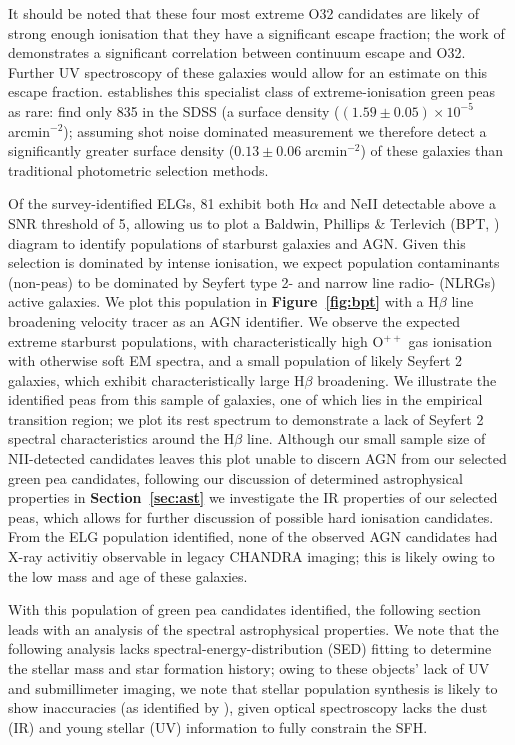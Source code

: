 \documentclass[fleqn,usenatbib]{mnras}
\begin{document}
It should be noted that these four most extreme O32 candidates are likely of strong enough ionisation that they have a significant escape fraction; the work of \cite{izotov_2018} demonstrates a significant correlation between continuum escape and O32. Further UV spectroscopy of these galaxies would allow for an estimate on this escape fraction. \cite{izotov_2018} establishes this specialist class of extreme-ionisation green peas as rare: \cite{jiang} find only 835 in the SDSS (a surface density ($(1.59\pm0.05)\times10^{-5}\;$arcmin$^{-2}$); assuming shot noise dominated measurement we therefore detect a significantly greater surface density ($0.13\pm0.06\;$arcmin$^{-2}$) of these galaxies than traditional photometric selection methods. 

Of the survey-identified ELGs, 81 exhibit both H$\alpha$ and NeII detectable above a SNR threshold of 5, allowing us to plot a Baldwin, Phillips \& Terlevich (BPT, \cite{baldwin1981}) diagram to identify populations of starburst galaxies and AGN. Given this selection is dominated by intense ionisation, we expect population contaminants (non-peas) to be dominated by Seyfert type 2- and  narrow line radio- (NLRGs) active galaxies. We plot this population in \textbf{Figure~\ref{fig:bpt}} with a H$\beta$ line broadening velocity tracer as an AGN identifier. We observe the expected extreme starburst populations, with characteristically high O$^{++}$ gas ionisation with otherwise soft EM spectra, and a small population of likely Seyfert 2 galaxies, which exhibit characteristically large H$\beta$ broadening. We illustrate the identified peas from this sample of galaxies, one of which lies in the \cite{kauffman2003} empirical transition region; we plot its rest spectrum to demonstrate a lack of Seyfert 2 spectral characteristics around the H$\beta$ line. Although our small sample size of NII-detected candidates leaves this plot unable to discern AGN from our selected green pea candidates, following our discussion of determined astrophysical properties in \textbf{Section~\ref{sec:ast}} we investigate the IR properties of our selected peas, which allows for further discussion of possible hard ionisation candidates. From the ELG population identified, none of the observed AGN candidates had X-ray activitiy observable in legacy CHANDRA imaging; this is likely owing to the low mass and age of these galaxies.

With this population of green pea candidates identified, the following section leads with an analysis of the spectral astrophysical properties. We note that the following analysis lacks spectral-energy-distribution (SED) fitting to determine the stellar mass and star formation history; owing to these objects' lack of UV and submillimeter imaging, we note that stellar population synthesis is likely to show inaccuracies (as identified by \cite{brunker_2020, langeroodi2023}), given optical spectroscopy lacks the dust (IR) and young stellar (UV) information to fully constrain the SFH.
\end{document}

